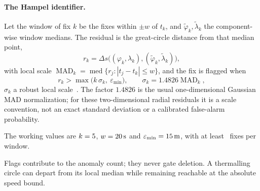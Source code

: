 \begin{revblock}
\paragraph{The Hampel identifier.}
Let the window of fix $k$ be the fixes within $\pm w$ of $t_k$, and
$\tilde\varphi_k,\tilde\lambda_k$ the component-wise window medians. The residual is the
great-circle distance from that median point,
\begin{equation}
\label{eq:hampelresid}
  r_k=\Delta s\big((\varphi_k,\lambda_k),(\tilde\varphi_k,\tilde\lambda_k)\big),
\end{equation}
with local scale $\operatorname{MAD}_k=\operatorname{med}\{r_j:|t_j-t_k|\le w\}$, and the
fix is flagged when
\begin{equation}
\label{eq:hampel}
  r_k > \max\!\big(k\,\sigma_k,\ \varepsilon_{\min}\big),
  \qquad \sigma_k = 1.4826\operatorname{MAD}_k,
\end{equation}
$\sigma_k$ a robust local scale~\cite{rousseeuw1993}. The factor $1.4826$ is the
usual one-dimensional Gaussian MAD normalization; for these two-dimensional radial
residuals it is a scale convention, not an exact standard deviation or a calibrated
false-alarm probability.

The working values are $k=5$,
$w=\SI{20}{\second}$ and
$\varepsilon_{\min}=\SI{15}{\metre}$, with at least
\PreprocHampelMinFixes\ fixes per window.

Flags contribute to the anomaly count;
they never gate deletion. A thermalling circle can depart from its local median
while remaining reachable at the absolute speed bound.

\end{revblock}

